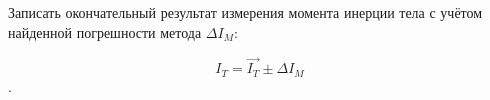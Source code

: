 \item Записать окончательный результат измерения момента инерции тела с учётом найденной погрешности метода $\Delta I_M$:

    \begin{equation*}
        I_T = \vec{I_T}\pm \Delta I_M
    \end{equation*}.